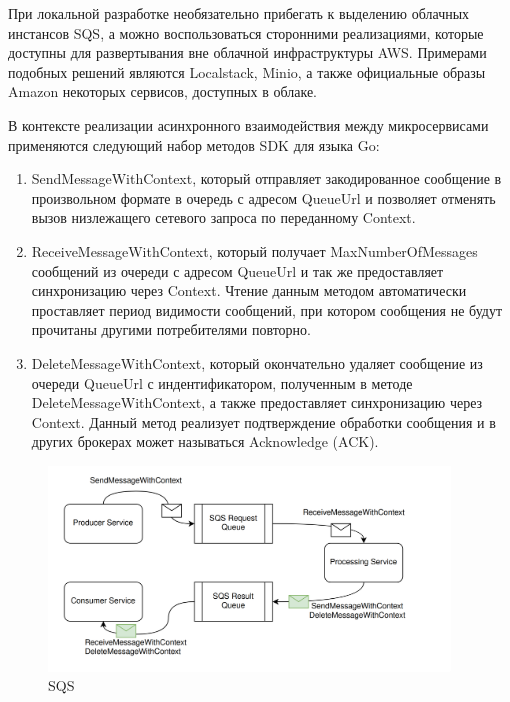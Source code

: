 При локальной разработке необязательно прибегать к выделению облачных инстансов SQS, а можно воспользоваться сторонними реализациями, которые доступны для развертывания вне облачной инфраструктуры AWS. Примерами подобных решений являются Localstack, Minio, а также официальные образы Amazon
некоторых сервисов, доступных в облаке.

В контексте реализации асинхронного взаимодействия между микросервисами применяются следующий набор методов SDK для языка Go:
\begin{enumerate}
    \item SendMessageWithContext, который отправляет закодированное сообщение в произвольном формате в очередь с адресом QueueUrl и позволяет отменять вызов низлежащего сетевого запроса по переданному Context.
    \item ReceiveMessageWithContext, который получает MaxNumberOfMessages сообщений из очереди с адресом QueueUrl и так же предоставляет синхронизацию через Context.
    Чтение данным методом автоматически проставляет период видимости сообщений, при котором сообщения не будут прочитаны другими 
    потребителями повторно.
    \item DeleteMessageWithContext, который окончательно удаляет сообщение из очереди QueueUrl с индентификатором, 
    полученным в методе DeleteMessageWithContext, а также предоставляет синхронизацию через Context.
     Данный метод реализует подтверждение обработки сообщения и в других 
    брокерах может называться Acknowledge (ACK).
\end{enumerate}

\begin{figure}[H]
  \centering
  \includegraphics[width=0.95\textwidth]{img/sqs.png}
  \caption{SQS}
    \label{fig:sqs}
\end{figure}


